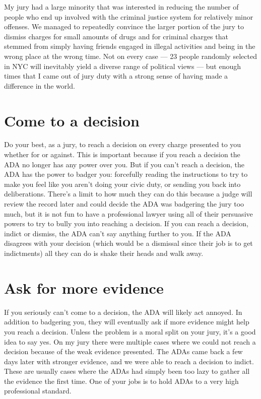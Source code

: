 \documentclass[letterpaper]{article}
\begin{document}
My jury had a large minority that was interested in reducing the number of people who end up involved with the criminal justice system for relatively minor offenses.
We managed to repeatedly convince the larger portion of the jury to dismiss charges for small amounts of drugs and for criminal charges that stemmed from simply having friends engaged in illegal activities and being in the wrong place at the wrong time.
Not on every case --- 23 people randomly selected in NYC will inevitably yield a diverse range of political views --- but enough times that I came out of jury duty with a strong sense of having made a difference in the world.


\section*{Come to a decision}
Do your best, as a jury, to reach a decision on every charge presented to you whether for or against.
This is important because if you reach a decision the ADA no longer has any power over you.
But if you can't reach a decision, the ADA has the power to badger you: forcefully reading the instructions to try to make you feel like you aren't doing your civic duty, or sending you back into deliberations. 
There's a limit to how much they can do this because a judge will review the record later and could decide the ADA was badgering the jury too much, but it is not fun to have a professional lawyer using all of their persuasive powers to try to bully you into reaching a decision. 
If you can reach a decision, indict or dismiss, the ADA can't say anything further to you. 
If the ADA disagrees with your decision (which would be a dismissal since their job is to get indictments) all they can do is shake their heads and walk away.

\section*{Ask for more evidence}
If you seriously can't come to a decision, the ADA will likely act annoyed.
In addition to badgering you, they will eventually ask if more evidence might help you reach a decision.
Unless the problem is a moral split on your jury, it's a good idea to say yes.
On my jury there were multiple cases where we could not reach a decision because of the weak evidence presented.
The ADAs came back a few days later with stronger evidence, and we were able to reach a decision to indict.
These are usually cases where the ADAs had simply been too lazy to gather all the evidence the first time.
One of your jobs is to hold ADAs to a very high professional standard.
\end{document}

